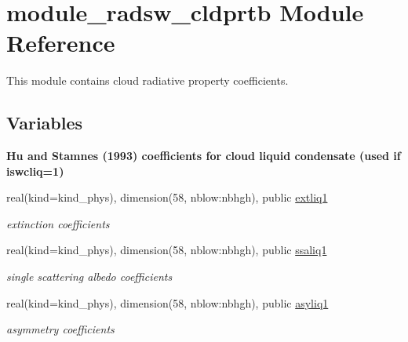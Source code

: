 \hypertarget{namespacemodule__radsw__cldprtb}{}\section{module\+\_\+radsw\+\_\+cldprtb Module Reference}
\label{namespacemodule__radsw__cldprtb}


This module contains cloud radiative property coefficients.  


\subsection*{Variables}
\begin{Indent}\textbf{ Hu and Stamnes (1993) coefficients for cloud liquid condensate (used if iswcliq=1)}\par
\begin{DoxyCompactItemize}
\item 
\mbox{\label{namespacemodule__radsw__cldprtb_ac68593a33577c720ca8c74eafb3c9f96}} 
real(kind=kind\+\_\+phys), dimension(58, nblow\+:nbhgh), public \hyperlink{namespacemodule__radsw__cldprtb_ac68593a33577c720ca8c74eafb3c9f96}{extliq1}
\begin{DoxyCompactList}\small\item\em extinction coefficients \end{DoxyCompactList}\item 
\mbox{\label{namespacemodule__radsw__cldprtb_a7944084ba9f240723dc93467ec66f825}} 
real(kind=kind\+\_\+phys), dimension(58, nblow\+:nbhgh), public \hyperlink{namespacemodule__radsw__cldprtb_a7944084ba9f240723dc93467ec66f825}{ssaliq1}
\begin{DoxyCompactList}\small\item\em single scattering albedo coefficients \end{DoxyCompactList}\item 
\mbox{\label{namespacemodule__radsw__cldprtb_a430be0720aa2e2ac46aa1ec7c9a9b64b}} 
real(kind=kind\+\_\+phys), dimension(58, nblow\+:nbhgh), public \hyperlink{namespacemodule__radsw__cldprtb_a430be0720aa2e2ac46aa1ec7c9a9b64b}{asyliq1}
\begin{DoxyCompactList}\small\item\em asymmetry coefficients \end{DoxyCompactList}\end{DoxyCompactItemize}
\end{Indent}
